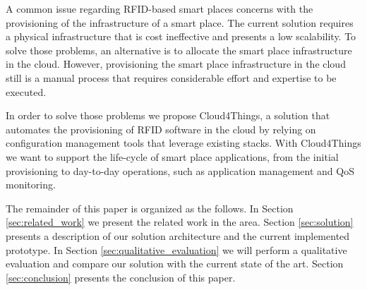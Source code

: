 A common issue regarding RFID-based smart places concerns with the provisioning of the infrastructure of
a smart place. The current solution requires a physical infrastructure that is cost ineffective and presents
a low scalability. To solve those problems, an alternative is to allocate the smart place infrastructure
in the cloud. However, provisioning the smart place infrastructure in the cloud still is a manual
process that requires considerable effort and expertise to be executed.

In order to solve those problems we propose Cloud4Things, a solution that automates the provisioning of RFID
software in the cloud by relying on configuration management tools that leverage existing stacks.
With Cloud4Things we want to support the life-cycle of smart place applications, from the initial
provisioning to day-to-day operations, such as application management and QoS monitoring.

The remainder of this paper is organized as the follows. In Section \ref{sec:related_work} we
present the related work in the area. Section \ref{sec:solution} presents a description of our
solution architecture and the current implemented prototype. In Section \ref{sec:qualitative_evaluation}
we will perform a qualitative evaluation and compare our solution with the current state of the art.
Section \ref{sec:conclusion} presents the conclusion of this paper.
